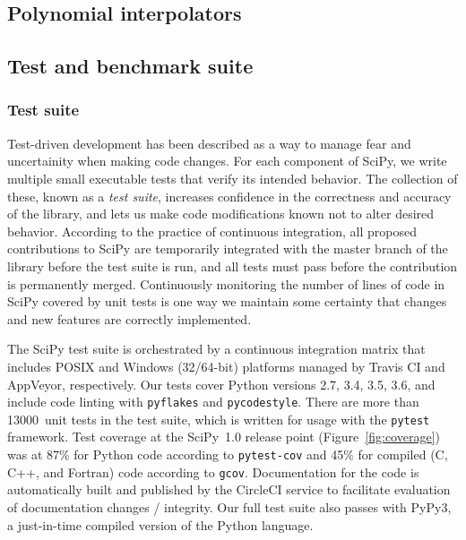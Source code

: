 \documentclass[fleqn,10pt]{wlscirep}
\begin{document}
\subsection*{Polynomial interpolators}



\subsection*{Test and benchmark suite}

\subsubsection*{Test suite}

Test-driven development has been described as a way to manage fear and
uncertainity when making code changes\cite{TDD-Beck}. For each component of 
SciPy, we write multiple small executable tests that verify its intended
behavior. The collection of these, known as a \emph{test suite}, increases
confidence in the correctness and accuracy of the library, and lets us make
code modifications known not to alter desired behavior.
According to the practice of continuous integration\cite{silver2017collaborative}, all proposed contributions
to SciPy are temporarily integrated with the master branch of the library
before the test suite is run, and all tests must pass before the contribution
is permanently merged.
Continuously monitoring the number
of lines of code in SciPy covered by unit tests is one way we maintain
some certainty that changes and new features are correctly implemented.

The SciPy test suite is orchestrated by a continuous integration matrix that
includes POSIX and Windows (32/64-bit) platforms managed by Travis CI and
AppVeyor, respectively. Our tests cover Python versions 2.7, 3.4, 3.5, 3.6, and
include code linting with \texttt{pyflakes} and \texttt{pycodestyle}. There
are more than \num{13000}~unit tests in the test suite, which is written for usage
with the \texttt{pytest}\cite{pytest} framework.
Test coverage at the SciPy~1.0 release point (Figure~\ref{fig:coverage}) was at
87\% for Python code according to \texttt{pytest-cov}\cite{pytest-cov} and
45\% for compiled (C, C++, and Fortran) code according to \texttt{gcov}\cite{gcov}.
Documentation for the code is automatically built and published by
the CircleCI service to facilitate evaluation of documentation changes /
integrity.  Our full test suite also passes with PyPy3\cite{Bolz:2009:TMP:1565824.1565827}, a just-in-time compiled
version of the Python language.
\end{document}

